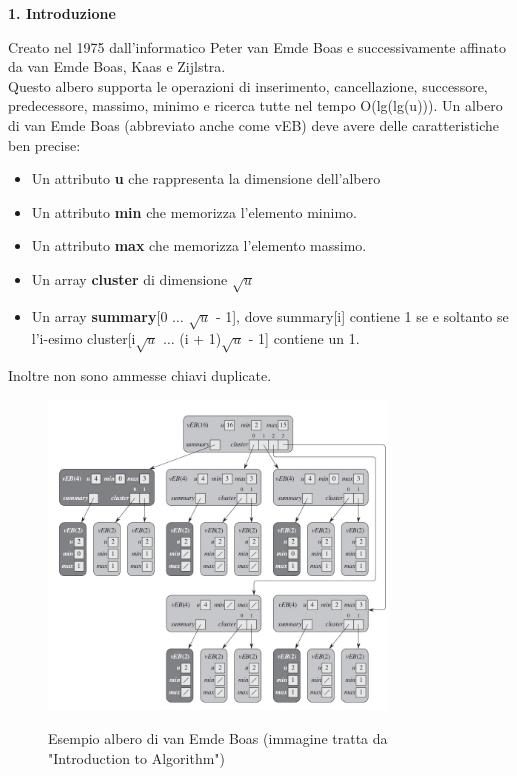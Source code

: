 \documentclass{article}
\begin{document}
\begin{flushleft}
\huge \textbf{1. Introduzione}
\newline
\newline
\normalsize
    
    Creato nel 1975 dall'informatico Peter van Emde Boas e successivamente affinato da van Emde Boas, Kaas e Zijlstra.\\
    Questo albero supporta le operazioni di inserimento, cancellazione, successore, predecessore, massimo, minimo e ricerca tutte nel tempo O(lg(lg(u))).
    Un albero di van Emde Boas (abbreviato anche come vEB) deve avere delle caratteristiche ben precise:
    \begin{itemize}
        \item Un attributo \textbf{u} che rappresenta la dimensione dell'albero
        \item Un attributo \textbf{min} che memorizza l'elemento minimo.
        \item Un attributo \textbf{max} che memorizza l'elemento massimo.
        \item Un array \textbf{cluster} di dimensione $\sqrt{u}$
        \item Un array \textbf{summary}[0 $\dots$ $\sqrt{u}$ - 1], dove summary[i] contiene 1 se e soltanto se l'i-esimo cluster[i$\sqrt{u}$ $\dots$ (i + 1)$\sqrt{u}$ - 1] contiene un 1.
    \end{itemize}
    Inoltre non sono ammesse chiavi duplicate.\\
\end{flushleft}

\begin{figure}[h!]
    \begin{center}
    \includegraphics[width=9cm]{vEB.jpg}\\
    \caption{Esempio albero di van Emde Boas (immagine tratta da "Introduction to Algorithm")}
    \end{center}
\end{figure}
\end{document}
